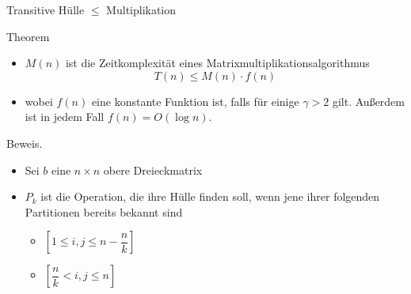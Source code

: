 \documentclass{beamer}
\begin{document}

	\begin{frame}{Transitive Hülle $\le$ Multiplikation}
		\begin{block} {Theorem}
			\begin{itemize}
				\item $M(n)$ ist die Zeitkomplexität eines Matrixmultiplikationsalgorithmus
				$$T(n) \le M(n) \cdot f(n)$$
				\item wobei $f(n)$ eine konstante Funktion ist, falls für einige $\gamma  > 2$ gilt. Außerdem ist in jedem Fall $f(n) = O(\log n)$. 
			\end{itemize}
		\end{block}
		\pause
		Beweis. 
		\begin{itemize}
			\item Sei $b$ eine $n \times n$ obere Dreieckmatrix
			\item $P_k$ ist die Operation, die ihre Hülle finden soll, wenn jene ihrer folgenden Partitionen bereits bekannt sind
			\begin{itemize}
				\item $[1 \le i, j \le n - \dfrac{n}{k}]$
				\item $[\dfrac{n}{k} < i, j \le n]$
			\end{itemize}
		\end{itemize}
	\end{frame}
\end{document}
